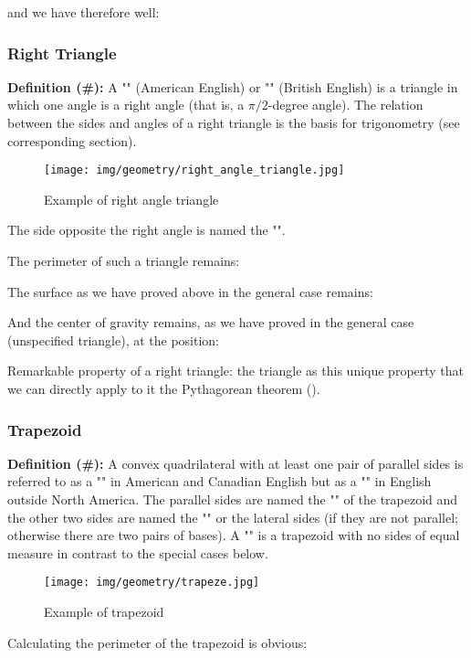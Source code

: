 {\begin{dem}
	and we have therefore well:
	
	\end{dem}
	
	\subsubsection{Right Triangle}
	\textbf{Definition (\#\mydef):} A "" (American English) or "" (British English) is a triangle in which one angle is a right angle (that is, a $\pi/2$-degree angle). The relation between the sides and angles of a right triangle is the basis for trigonometry (see corresponding section).
	\begin{figure}[H]
		\centering
		\texttt{[image: img/geometry/right\_angle\_triangle.jpg]}
		\caption{Example of right angle triangle}
	\end{figure}
	The side opposite the right angle is named the "".
	
	The perimeter of such a triangle remains:
	
	The surface as we have proved above in the general case remains:
	
	
	And the center of gravity remains, as we have proved in the general case (unspecified triangle), at the position:
	
	Remarkable property of a right triangle: the triangle as this unique property that we can directly apply to it the Pythagorean theorem ().
	
	
	\subsubsection{Trapezoid}
	\textbf{Definition (\#\mydef):} A convex quadrilateral with at least one pair of parallel sides is referred to as a "" in American and Canadian English but as a "" in English outside North America. The parallel sides are named the "" of the trapezoid and the other two sides are named the "" or the lateral sides (if they are not parallel; otherwise there are two pairs of bases). A "" is a trapezoid with no sides of equal measure in contrast to the special cases below.
	\begin{figure}[H]
		\centering
		\texttt{[image: img/geometry/trapeze.jpg]}
		\caption{Example of trapezoid}
	\end{figure}
	Calculating the perimeter of the trapezoid is obvious:
	
}

